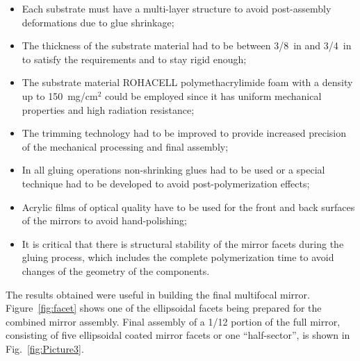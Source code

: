 \begin{itemize}
\item Each substrate must have a multi-layer structure to avoid post-assembly deformations due to glue
  shrinkage;
\item The thickness of the substrate material had to be between 3/8~in and 3/4~in to satisfy the requirements
  and to stay rigid enough;
\item The substrate material ROHACELL polymethacrylimide foam with a density up to 150~mg/cm$^2$
  could be employed since it has uniform mechanical properties and high radiation resistance;
\item The trimming technology had to be improved to provide increased precision of the mechanical
  processing and final assembly;
\item In all gluing operations non-shrinking glues had to be used or a special technique had to be developed to
  avoid post-polymerization effects;
\item Acrylic films of optical quality have to be used for the front and back surfaces of the mirrors to avoid
  hand-polishing;
\item It is critical that there is structural stability of the mirror facets during the gluing process, which
  includes the complete polymerization time to avoid changes of the geometry of the components.
\end{itemize}

The results obtained were useful in building the final multifocal mirror. Figure~\ref{fig:facet} shows one of the
ellipsoidal facets being prepared for the combined mirror assembly. Final assembly of a 1/12 portion of the full
mirror, consisting of five ellipsoidal coated mirror facets or one ``half-sector'', is shown in
Fig.~\ref{fig:Picture3}.

